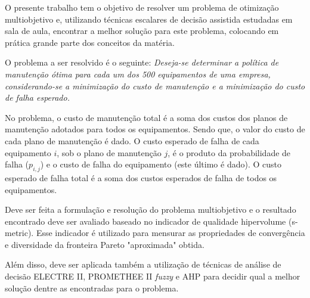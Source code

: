 O presente trabalho tem o objetivo de resolver um problema de otimização multiobjetivo e, utilizando técnicas escalares de decisão assistida estudadas em sala de aula, encontrar a melhor solução para este problema, colocando em prática grande parte dos conceitos da matéria.

O problema a ser resolvido é o seguinte: \emph{Deseja-se determinar a política de manutenção ótima para cada um dos 500 equipamentos de	uma empresa, considerando-se a minimização do custo de manutenção e a minimização do custo de falha esperado.}

No problema, o custo de manutenção total é a soma dos custos dos planos de manutenção adotados para todos os equipamentos. Sendo que, o valor do custo de cada plano de manutenção é dado. O custo esperado de falha de cada equipamento $i$, sob o plano de manutenção $j$, é o produto da probabilidade de falha ($p_{i,j}$) e o custo de falha do equipamento (este último é dado). O
custo esperado de falha total é a soma dos custos esperados de falha de todos os equipamentos.

Deve ser feita a formulação e resolução do problema multiobjetivo e o resultado encontrado deve ser avaliado baseado no indicador de qualidade hipervolume (s-metric). Esse indicador é utilizado para mensurar as propriedades de convergência e diversidade da fronteira Pareto "aproximada" obtida.

Além disso, deve ser aplicada também a utilização de técnicas de análise de decisão ELECTRE II, PROMETHEE II \emph{fuzzy} e AHP para decidir qual a melhor solução dentre as encontradas para o problema.